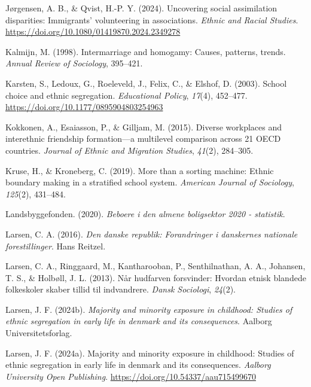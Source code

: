 \documentclass[
]{book}
\newlength{\cslhangindent}
\newenvironment{CSLReferences}[2] %
 {\begin{list}{}{%
  \setlength{\itemindent}{0pt}
  \setlength{\leftmargin}{0pt}
  \setlength{\parsep}{0pt}
  \ifodd #1
   \setlength{\leftmargin}{\cslhangindent}
   \setlength{\itemindent}{-1\cslhangindent}
  \fi
  \setlength{\itemsep}{#2\baselineskip}}}
 {\end{list}}
\begin{document}
\begin{CSLReferences}{1}{0}
Jørgensen, A. B., \& Qvist, H.-P. Y. (2024). Uncovering social assimilation disparities: Immigrants' volunteering in associations. \emph{Ethnic and Racial Studies}. \url{https://doi.org/10.1080/01419870.2024.2349278}

Kalmijn, M. (1998). Intermarriage and homogamy: Causes, patterns, trends. \emph{Annual Review of Sociology}, 395--421.

Karsten, S., Ledoux, G., Roeleveld, J., Felix, C., \& Elshof, D. (2003). School choice and ethnic segregation. \emph{Educational Policy}, \emph{17}(4), 452--477. \url{https://doi.org/10.1177/0895904803254963}

Kokkonen, A., Esaiasson, P., \& Gilljam, M. (2015). Diverse workplaces and interethnic friendship formation---a multilevel comparison across 21 OECD countries. \emph{Journal of Ethnic and Migration Studies}, \emph{41}(2), 284--305.

Kruse, H., \& Kroneberg, C. (2019). More than a sorting machine: Ethnic boundary making in a stratified school system. \emph{American Journal of Sociology}, \emph{125}(2), 431--484.

Landsbyggefonden. (2020). \emph{Beboere i den almene boligsektor 2020 - statistik}.

Larsen, C. A. (2016). \emph{Den danske republik: Forandringer i danskernes nationale forestillinger}. Hans Reitzel.

Larsen, C. A., Ringgaard, M., Kantharooban, P., Senthilnathan, A. A., Johansen, T. S., \& Holbøll, J. L. (2013). Når hudfarven forsvinder: Hvordan etnisk blandede folkeskoler skaber tillid til indvandrere. \emph{Dansk Sociologi}, \emph{24}(2).

Larsen, J. F. (2024b). \emph{Majority and minority exposure in childhood: Studies of ethnic segregation in early life in denmark and its consequences}. Aalborg Universitetsforlag.

Larsen, J. F. (2024a). Majority and minority exposure in childhood: Studies of ethnic segregation in early life in denmark and its consequences. \emph{Aalborg University Open Publishing}. \url{https://doi.org/10.54337/aau715499670}


\end{CSLReferences}
\end{document}
